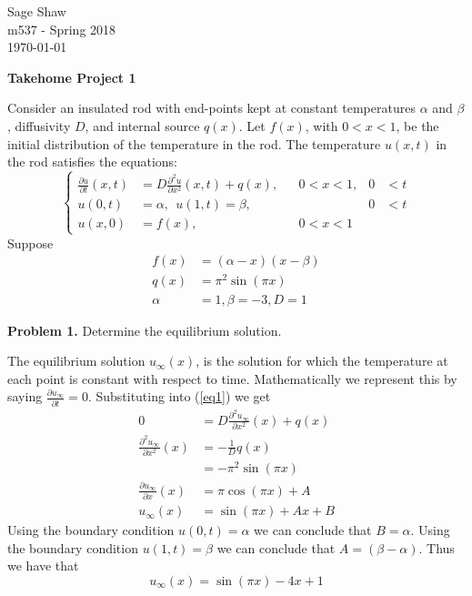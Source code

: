 \documentclass[12pt]{article}
\newcommand{\problem}[1]{\hspace{-4 ex} \large \textbf{Problem #1} }
\begin{document}
	\thispagestyle{empty}
	
	\begin{flushright}
		Sage Shaw \\
		m537 - Spring 2018 \\
		\today
	\end{flushright}
	
{\large \textbf{Takehome Project 1}}\bigbreak

Consider an insulated rod with end-points kept at constant temperatures $\alpha$ and $\beta$, diffusivity $D$, and internal source $q(x)$. Let $f(x)$, with $0<x<1$, be the initial distribution of the temperature in the rod. The temperature $u(x,t)$ in the rod satisfies the equations:
\begin{equation}
 \left \{
	\begin{aligned}
		\frac{\partial u}{\partial t}(x,t) & = D \frac{\partial^2u}{\partial x^2}(x,t) + q(x), && 0 <x <1, & 0&<t \\
		u(0,t) & = \alpha, \ \  u(1,t) = \beta, && & 0 & < t \\
		u(x,0) & = f(x), && 0  < x < 1
	\end{aligned} 
\right . \label{eq1}
\end{equation}
Suppose
\begin{align*}
	f(x) & = (\alpha - x)(x- \beta) \\
	 q(x) & = \pi^2\sin(\pi x) \\
	\alpha & = 1, \beta = -3, D=1
\end{align*}

\problem{1.} Determine the equilibrium solution. \bigbreak

The equilibrium solution $u_{\infty}(x)$, is the solution for which the temperature at each point is constant with respect to time. Mathematically we represent this by saying $\frac{\partial u_\infty}{\partial t} = 0$. Substituting into (\ref{eq1}) we get
\begin{align*}
0 & = D \frac{\partial^2u_\infty}{\partial x^2}(x) + q(x) \\
\frac{\partial^2u_\infty}{\partial x^2}(x) & = -\frac{1}{D}q(x) \\
& = -\pi^2 \sin(\pi x) \\
\frac{\partial u_\infty}{\partial x}(x) & = \pi \cos(\pi x) + A\\
u_\infty(x) & = \sin(\pi x) + Ax + B
\end{align*}
Using the boundary condition $u(0,t)=\alpha$ we can conclude that $B = \alpha$. Using the boundary condition $u(1,t) = \beta$ we can conclude that $A = (\beta - \alpha)$. Thus we have that 
$$
u_\infty(x) = \sin(\pi x) - 4x + 1
$$
\end{document}
